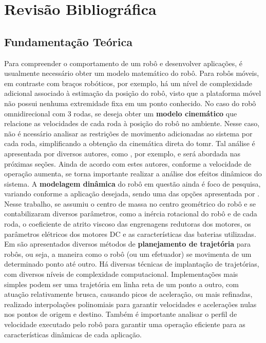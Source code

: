 \section{Revisão Bibliográfica}
\label{sec:revbib}

\subsection{Fundamentação Teórica}

Para compreender o comportamento de um robô e desenvolver aplicações, é usualmente necessário obter um modelo matemático do robô. Para robôs móveis, em contraste com braços robóticos, por exemplo, há um nível de complexidade adicional associado à estimação da posição do robô, visto que a plataforma móvel não possui nenhuma extremidade fixa em um ponto conhecido. No caso do robô omnidirecional com 3 rodas, se deseja obter um \textbf{modelo cinemático} que relacione as velocidades de cada roda à posição do robô no ambiente. Nesse caso, não é ncessário analisar as restrições de movimento adicionadas ao sistema por cada roda, simplificando a obtenção da cinemática direta do \acrlong{tomr}. Tal análise é apresentada por diversos autores, como \citet{siegwart2011introduction}, por exemplo, e será abordada nas próximas seções. Ainda de acordo com estes autores, conforme a velocidade de operação aumenta, se torna importante realizar a análise dos efeitos dinâmicos do sistema. A \textbf{modelagem dinâmica} do robô em questão ainda é foco de pesquisa, variando conforme a aplicação desejada, sendo uma das opções apresentada por \citet{kim2014minenergy}. Nesse trabalho, se assumiu o centro de massa no centro geométrico do robô e se contabilizaram diversos parâmetros, como a inércia rotacional do robô e de cada roda, o coeficiente de atrito viscoso das engrenagens redutoras dos motores, os parâmetros elétricos dos motores DC e as características das baterias utilizadas.
Em \citet{lynch2017modern} são apresentados diversos métodos de \textbf{planejamento de trajetória} para robôs, ou seja, a maneira como o robô (ou um efetuador) se movimenta de um determinado ponto até outro. Há diversas técnicas de implantação de trajetórias, com diversos níveis de complexidade computacional. Implementações mais simples podem ser uma trajetória em linha reta de um ponto a outro, com atuação relativamente brusca, causando picos de aceleração, ou mais refinadas, realizado interpolações polinomiais para garantir velocidades e acelerações nulas nos pontos de origem e destino. Também é importante analisar o perfil de velocidade executado pelo robô para garantir uma operação eficiente para as características dinâmicas de cada aplicação.

